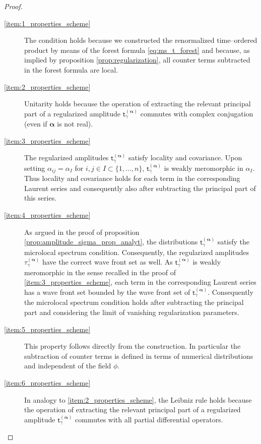 \documentclass[11pt]{book}
\newcommand{\hilight}[1]{\colorbox{yellow!80!black}{#1}}
\newcommand{\alphabd}{\boldsymbol{\alpha}}
\newcommand{\tsf}{\mathsf{t}}
\theoremstyle{break}
\begin{document}
\begin{proof}
\begin{description}
\item[\ref{item:1_properties_scheme}] The condition holds because we constructed the renormalized time--ordered product by means of the forest formula \eqref{eq:ms_t_forest} and because, as implied by proposition \ref{prop:regularization}, all counter terms subtracted in the forest formula are local.
%
%
%
%
\item[\ref{item:2_properties_scheme}] Unitarity holds because the operation of extracting the relevant principal part of a regularized amplitude $\tsf^{(\alphabd)}_\gamma$ commutes with complex conjugation (even if $\alphabd$ is not real).
%
%
%
%
\item[\ref{item:3_properties_scheme}] The regularized amplitudes $\tsf^{(\alphabd)}_\gamma$ satisfy locality and covariance. Upon setting $\alpha_{ij}=\alpha_I$ for $i,j\in I\subset \{1,\dots,n\}$, $\tsf^{(\alphabd)}_\gamma$ is weakly meromorphic in $\alpha_I$. Thus locality and covariance holds for each term in the corresponding Laurent series and consequently also after subtracting the principal part of this series.
%
%
%
%
\item[\ref{item:4_properties_scheme}] As argued in the proof of proposition \ref{prop:amplitude_sigma_prop_analyt}, the distributions $\tsf^{(\alphabd)}_\gamma$ satisfy the microlocal spectrum condition. Consequently, the regularized amplitudes $\tau^{(\alphabd)}_\gamma$ have the correct wave front set as well. As $\tsf^{(\alphabd)}_\gamma$ is weakly meromorphic in the sense recalled in the proof of \ref{item:3_properties_scheme}, each term in the corresponding Laurent series has a wave front set bounded by the wave front set of $\tsf^{(\alphabd)}_\gamma$. Consequently the microlocal spectrum condition holds after subtracting the principal part and considering the limit of vanishing regularization parameters.
%
%
%
%
\item[\ref{item:5_properties_scheme}] This property follows directly from the construction. In particular the subtraction of counter terms is defined in terms of numerical distributions and independent of the field $\phi$.
%
%
%
%
\item[\hilight{\ref{item:6_properties_scheme}}] In analogy to \ref{item:2_properties_scheme}, the Leibniz rule holds because the operation of extracting the relevant principal part of a regularized amplitude $\tsf^{(\alphabd)}_\gamma$ commutes with all partial differential operators.
%
%
%
%

\end{description}
\end{proof}
\end{document}
